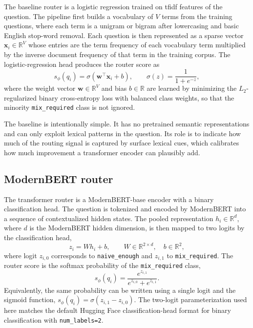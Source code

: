 \documentclass[english, bibtex]{kththesis}               %
\numberwithin{listing}{chapter}
\begin{document}
The baseline router is a logistic regression trained on \gls{tfidf} features of the question. The pipeline first builds a vocabulary of \(V\) terms from the training questions, where each term is a unigram or bigram after lowercasing and basic English stop-word removal. Each question is then represented as a sparse vector \(\mathbf{x}_i \in \mathbb{R}^{V}\) whose entries are the term frequency of each vocabulary term multiplied by the inverse document frequency of that term in the training corpus. The logistic-regression head produces the router score as
\begin{equation}
\label{eq:tfidfScore}
s_\phi(q_i) = \sigma(\mathbf{w}^\top \mathbf{x}_i + b),
\qquad
\sigma(z) = \frac{1}{1 + e^{-z}},
\end{equation}
where the weight vector \(\mathbf{w} \in \mathbb{R}^{V}\) and bias \(b \in \mathbb{R}\) are learned by minimizing the $L_2$-regularized binary cross-entropy loss with balanced class weights, so that the minority \texttt{mix\_required} class is not ignored.

The baseline is intentionally simple. It has no pretrained semantic representations and can only exploit lexical patterns in the question. Its role is to indicate how much of the routing signal is captured by surface lexical cues, which calibrates how much improvement a transformer encoder can plausibly add.

\subsection{ModernBERT router}
\label{sec:methodModernBert}

The transformer router is a ModernBERT-base \cite{warner2024modernbert} encoder with a binary classification head. The question is tokenized and encoded by ModernBERT into a sequence of contextualized hidden states. The pooled representation \(h_i \in \mathbb{R}^{d}\), where \(d\) is the ModernBERT hidden dimension, is then mapped to two logits by the classification head,
\begin{equation}
\label{eq:modernBertLogits}
z_i = W h_i + b,
\qquad
W \in \mathbb{R}^{2 \times d}, \quad b \in \mathbb{R}^{2},
\end{equation}
where logit \(z_{i,0}\) corresponds to \texttt{naive\_enough} and \(z_{i,1}\) to \texttt{mix\_required}. The router score is the softmax probability of the \texttt{mix\_required} class,
\begin{equation}
\label{eq:modernBertSoftmax}
s_\phi(q_i)
=
\frac{e^{z_{i,1}}}{e^{z_{i,0}} + e^{z_{i,1}}}.
\end{equation}
Equivalently, the same probability can be written using a single logit and the sigmoid function, $s_\phi(q_i) = \sigma(z_{i,1} - z_{i,0})$. The two-logit parameterization used here matches the default Hugging Face classification-head format for binary classification with \texttt{num\_labels=2}.
\end{document}
